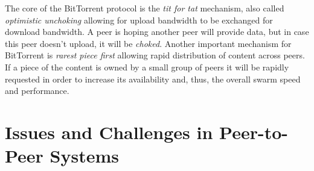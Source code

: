 The core of the BitTorrent protocol is the \textit{tit for tat} mechanism,
also called \textit{optimistic unchoking} allowing for upload bandwidth to be
exchanged for download bandwidth. A peer is hoping another peer will provide
data, but in case this peer doesn't upload, it will be \textit{choked}.
Another important mechanism for BitTorrent is \textit{rarest piece first}
allowing rapid distribution of content across peers. If a piece of the content
is owned by a small group of peers it will be rapidly requested in order to
increase its availability and, thus, the overall swarm speed and performance.


\section{Issues and Challenges in Peer-to-Peer Systems}
\label{sec:p2p-systems:issues}


